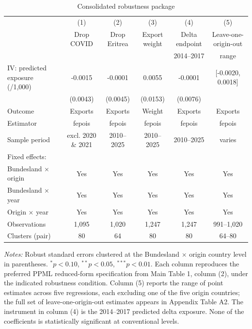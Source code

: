 \begin{table}[!htbp]
\centering
\caption{Consolidated robustness package}
\label{tab:appendix_robustness}
\small
\begin{tabular}{lccccc}
\toprule
 & (1) & (2) & (3) & (4) & (5) \\
 & Drop COVID & Drop Eritrea & Export weight & Delta endpoint & Leave-one-origin-out \\
 &  &  &  & 2014--2017 & range \\
\midrule
IV: predicted exposure (/1,000) & -0.0015 & -0.0001 & 0.0055 & -0.0001 & [-0.0020, 0.0018] \\
 & (0.0043) & (0.0045) & (0.0153) & (0.0076) &  \\
\midrule
Outcome & Exports & Exports & Weight & Exports & Exports \\
Estimator & fepois & fepois & fepois & fepois & fepois \\
Sample period & excl. 2020 \& 2021 & 2010–2025 & 2010–2025 & 2010–2025 & varies \\
\midrule
Fixed effects: &  &  &  &  &  \\
  Bundesland × origin & Yes & Yes & Yes & Yes & Yes \\
  Bundesland × year & Yes & Yes & Yes & Yes & Yes \\
  Origin × year & Yes & Yes & Yes & Yes & Yes \\
\midrule
Observations & 1,095 & 1,020 & 1,247 & 1,247 & 991–1,020 \\
Clusters (pair) & 80 & 64 & 80 & 80 & 64–80 \\
\bottomrule
\end{tabular}
\begin{minipage}{0.95\textwidth}
\vspace{0.2cm}
\footnotesize
\textit{Notes:} Robust standard errors clustered at the Bundesland $\times$ origin country level in parentheses. $^{*}p<0.10$, $^{**}p<0.05$, $^{***}p<0.01$. Each column reproduces the preferred PPML reduced-form specification from Main Table 1, column (2), under the indicated robustness condition. Column (5) reports the range of point estimates across five regressions, each excluding one of the five origin countries; the full set of leave-one-origin-out estimates appears in Appendix Table A2. The instrument in column (4) is the 2014--2017 predicted delta exposure. None of the coefficients is statistically significant at conventional levels.
\end{minipage}
\end{table}
